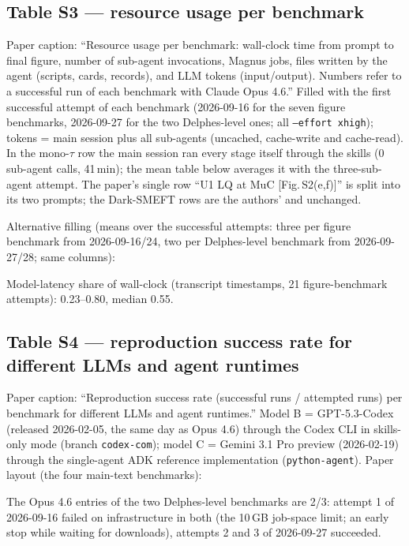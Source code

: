 \documentclass[10pt,a4paper]{article}
\newcommand{\code}[1]{\texttt{#1}}
\newcommand{\wide}[1]{\noindent\resizebox{\textwidth}{!}{#1}}
\begin{document}
\subsection*{Table S3 --- resource usage per benchmark}
Paper caption: ``Resource usage per benchmark: wall-clock time from prompt to final figure, number of sub-agent invocations,
Magnus jobs, files written by the agent (scripts, cards, records), and LLM tokens (input/output). Numbers refer to a
successful run of each benchmark with Claude Opus 4.6.'' Filled with the first successful attempt of each benchmark
(2026-09-16 for the seven figure benchmarks, 2026-09-27 for the two Delphes-level ones; all \code{--effort xhigh}); tokens = main
session plus all sub-agents (uncached, cache-write and cache-read). In the mono-$\tau$ row the main session ran every stage itself
through the skills (0 sub-agent calls, 41\,min); the mean table below averages it with the three-sub-agent attempt. The paper's single row ``U1 LQ at MuC [Fig.\,S2(e,f)]'' is split into its two prompts; the Dark-SMEFT rows are the
authors' and unchanged.
\begin{center}\footnotesize\setlength{\tabcolsep}{4pt}\wide{}\end{center}

Alternative filling (means over the successful attempts: three per figure benchmark from 2026-09-16/24, two per Delphes-level
benchmark from 2026-09-27/28; same columns):
\begin{center}\footnotesize\setlength{\tabcolsep}{4pt}\wide{}\end{center}

Model-latency share of wall-clock (transcript timestamps, 21 figure-benchmark attempts): 0.23--0.80, median 0.55.

\subsection*{Table S4 --- reproduction success rate for different LLMs and agent runtimes}
Paper caption: ``Reproduction success rate (successful runs / attempted runs) per benchmark for different LLMs and agent
runtimes.'' Model B = GPT-5.3-Codex (released 2026-02-05, the same day as Opus 4.6) through the Codex CLI in skills-only mode
(branch \code{codex-com}); model C = Gemini 3.1 Pro preview (2026-02-19) through the single-agent ADK reference implementation
(\code{python-agent}). Paper layout (the four main-text benchmarks):
\begin{center}\small\end{center}
The Opus 4.6 entries of the two Delphes-level benchmarks are 2/3: attempt 1 of 2026-09-16 failed on infrastructure in both
(the 10\,GB job-space limit; an early stop while waiting for downloads), attempts 2 and 3 of 2026-09-27 succeeded.
\end{document}
